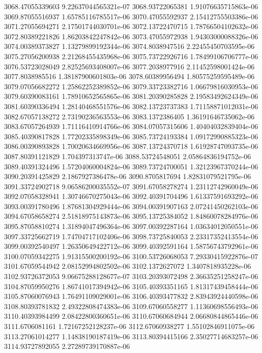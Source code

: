 {3068.47055339603 9.22637044565321e-07
3068.93722065381 1.91076635715863e-06
3069.87055516937 1.65785116785517e-06
3070.47055592937 2.15412755503386e-06
3071.27055694271 2.17501744030701e-06
3072.13722470715 1.78766504102632e-06
3072.80389221826 1.86203842247842e-06
3073.47055972938 1.94303000088326e-06
3074.00389373827 1.13279899192344e-06
3074.8038947516 2.22455450703595e-06
3075.27056200938 2.21268455435968e-06
3075.73722926716 1.78499106706777e-06
3076.53723028049 2.82525693408007e-06
3077.2038977916 2.11452598001424e-06
3077.8038985516 1.38187900601803e-06
3078.60389956494 1.80575259595489e-06
3079.07056682272 1.25862252389852e-06
3079.33723382716 1.06679816030953e-06
3079.60390083161 1.78910652565865e-06
3081.20390285828 2.19583492624349e-06
3081.60390336494 1.28140468551576e-06
3082.13723737383 1.71158871012031e-06
3082.67057138272 2.73190236563553e-06
3083.1372386405 1.36191646735062e-06
3083.67057264939 1.71116410914766e-06
3084.07057315606 1.40404032839404e-06
3085.40390817828 1.77202335898349e-06
3085.73724193384 1.09172990885323e-06
3086.00390893828 1.70020634669956e-06
3087.13724370718 1.61928747093735e-06
3087.80391121829 1.704397313747e-06
3088.53724548051 2.05864836194752e-06
3089.40391324496 1.57204060004824e-06
3089.73724700051 1.32123967370244e-06
3090.20391425829 2.1867927386478e-06
3090.8705817694 1.82831079521795e-06
3091.33724902718 9.06586200035552e-07
3091.67058278274 1.23112742960049e-06
3092.07058328941 1.30746670275043e-06
3092.40391704496 1.61337591693292e-06
3093.00391780496 1.87681304929444e-06
3094.00391907163 2.07241450262103e-06
3094.67058658274 2.51818975143873e-06
3095.13725384052 1.84860078284976e-06
3095.87058810274 1.31894047496364e-06
3097.00392287164 1.03634012050551e-06
3097.33725662719 1.74704717102406e-06
3098.73725840053 2.23317352413554e-06
3099.00392540497 1.26350649422712e-06
3099.40392591164 1.58756743792961e-06
3100.07059342275 1.91315500200192e-06
3100.53726068053 7.29330415922876e-07
3101.67059544942 2.08152994802502e-06
3102.1372627072 1.3407818935228e-06
3102.93726372053 9.06675288128677e-07
3103.20393072498 2.36635251258247e-06
3104.87059950276 1.86741017394942e-06
3105.40393351165 1.81317439458444e-06
3105.87060076943 1.76491109029001e-06
3106.40393477832 2.83943924440598e-06
3108.80393781832 2.49322808474383e-06
3109.67060558277 1.11360698556493e-06
3110.40393984499 2.08422800360651e-06
3110.67060684944 2.06680844865446e-06
3111.6706081161 1.72167252128237e-06
3112.67060938277 1.55102846911075e-06
3113.27061014277 1.14838190187419e-06
3113.80394415166 2.35027714683257e-06
3114.93727892055 2.27289739170887e-06
}
